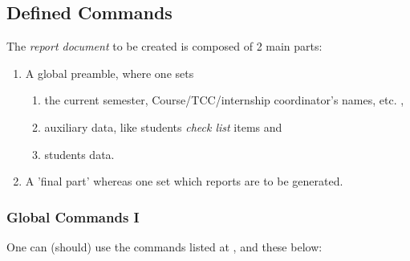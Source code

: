 \documentclass[article,nogeometry,english,tocdepth=3,secdepth=3]{ufrgscca} %
\begin{document}
\subsection{Defined Commands}
The \emph{report document} to be created is composed of 2 main parts:
\begin{enumerate}
	\item A global preamble, where one sets
	\begin{enumerate}
		\item the current semester, Course/TCC/internship coordinator's names, etc. ,
		\item auxiliary data, like students \emph{check list} items and
		\item students data.
	\end{enumerate}
    \item A 'final part' whereas one set which reports are to be generated.
\end{enumerate}

\subsubsection{Global Commands I}
One can (should) use the commands listed at , and these below:
\end{document}
